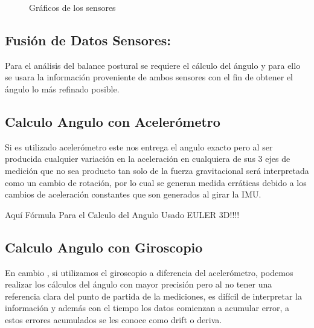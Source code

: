 \documentclass[12pt,a4paper]{article}
\begin{document}
\begin{figure}[H]
\centering
  \caption{Gráficos de los sensores}
  \label{fig:Graficosensores}
\end{figure}



\subsection{Fusión de Datos Sensores:}
Para el análisis del balance postural se requiere el cálculo del ángulo y para ello se usara la información proveniente de ambos sensores con el fin de obtener el ángulo lo más refinado posible.

\subsection{Calculo Angulo con Acelerómetro} Si es utilizado acelerómetro este nos entrega el angulo exacto pero al ser producida cualquier variación en la aceleración en cualquiera de sus 3 ejes de medición que no sea producto tan solo de la fuerza gravitacional será interpretada como un cambio de rotación, por lo cual se generan medida erráticas debido a los cambios de aceleración constantes que son generados al girar la IMU.

Aquí Fórmula Para el Calculo del Angulo Usado EULER 3D!!!! 

\subsection{Calculo Angulo con Giroscopio} 
En cambio , si utilizamos el giroscopio a diferencia del acelerómetro, podemos realizar los cálculos del ángulo con mayor precisión pero al no tener una referencia clara del punto de partida de la mediciones, es difícil de interpretar la información y además con el tiempo los datos comienzan a acumular error, a estos errores acumulados se les conoce como drift o deriva.
\end{document}
